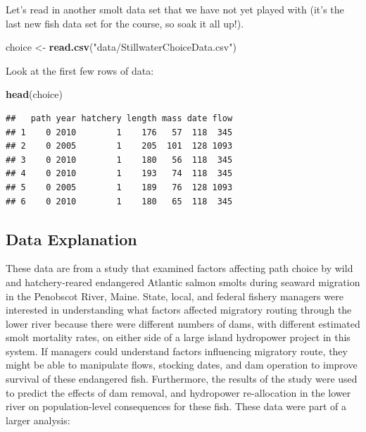 \documentclass[
]{book}
\newenvironment{Shaded}{\begin{snugshade}}{\end{snugshade}}
\newcommand{\KeywordTok}[1]{\textcolor[rgb]{0.13,0.29,0.53}{\textbf{#1}}}
\newcommand{\NormalTok}[1]{#1}
\newcommand{\StringTok}[1]{\textcolor[rgb]{0.31,0.60,0.02}{#1}}
\begin{document}
Let's read in another smolt data set that we have not yet played with (it's the last new fish data set for the course, so soak it all up!).

\begin{Shaded}
\begin{Highlighting}[]
\NormalTok{choice <-}\StringTok{ }\KeywordTok{read.csv}\NormalTok{(}\StringTok{"data/StillwaterChoiceData.csv"}\NormalTok{)}
\end{Highlighting}
\end{Shaded}

Look at the first few rows of data:

\begin{Shaded}
\begin{Highlighting}[]
\KeywordTok{head}\NormalTok{(choice)}
\end{Highlighting}
\end{Shaded}

\begin{verbatim}
##   path year hatchery length mass date flow
## 1    0 2010        1    176   57  118  345
## 2    0 2005        1    205  101  128 1093
## 3    0 2010        1    180   56  118  345
## 4    0 2010        1    193   74  118  345
## 5    0 2005        1    189   76  128 1093
## 6    0 2010        1    180   65  118  345
\end{verbatim}

\hypertarget{data-explanation}{%
\subsection{Data Explanation}\label{data-explanation}}

These data are from a study that examined factors affecting path choice by wild and hatchery-reared endangered Atlantic salmon smolts during seaward migration in the Penobscot River, Maine. State, local, and federal fishery managers were interested in understanding what factors affected migratory routing through the lower river because there were different numbers of dams, with different estimated smolt mortality rates, on either side of a large island hydropower project in this system. If managers could understand factors influencing migratory route, they might be able to manipulate flows, stocking dates, and dam operation to improve survival of these endangered fish. Furthermore, the results of the study were used to predict the effects of dam removal, and hydropower re-allocation in the lower river on population-level consequences for these fish. These data were part of a larger analysis:
\end{document}
